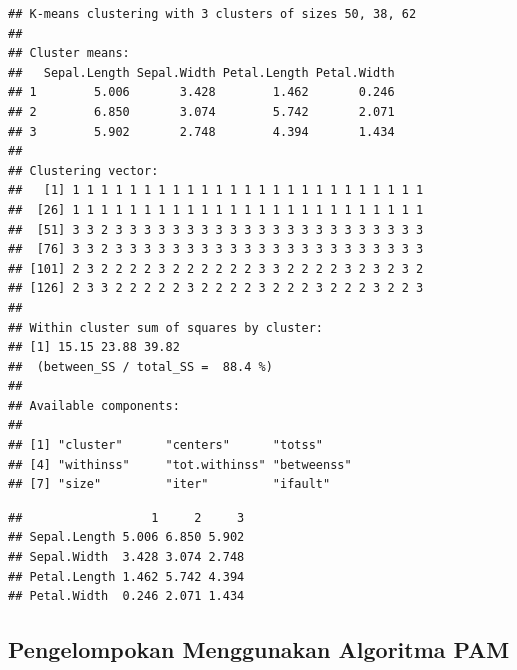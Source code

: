 \documentclass[
]{book}
\newenvironment{Shaded}{\begin{snugshade}}{\end{snugshade}}
\newcommand{\CommentTok}[1]{\textcolor[rgb]{0.56,0.35,0.01}{\textit{#1}}}
\newcommand{\ControlFlowTok}[1]{\textcolor[rgb]{0.13,0.29,0.53}{\textbf{#1}}}
\newcommand{\FunctionTok}[1]{\textcolor[rgb]{0.13,0.29,0.53}{\textbf{#1}}}
\newcommand{\NormalTok}[1]{#1}
\newcommand{\OtherTok}[1]{\textcolor[rgb]{0.56,0.35,0.01}{#1}}
\newcommand{\SpecialCharTok}[1]{\textcolor[rgb]{0.81,0.36,0.00}{\textbf{#1}}}
\theoremstyle{definition}
\theoremstyle{definition}
\theoremstyle{definition}
\theoremstyle{definition}
\theoremstyle{remark}
\begin{document}
\begin{verbatim}
## K-means clustering with 3 clusters of sizes 50, 38, 62
## 
## Cluster means:
##   Sepal.Length Sepal.Width Petal.Length Petal.Width
## 1        5.006       3.428        1.462       0.246
## 2        6.850       3.074        5.742       2.071
## 3        5.902       2.748        4.394       1.434
## 
## Clustering vector:
##   [1] 1 1 1 1 1 1 1 1 1 1 1 1 1 1 1 1 1 1 1 1 1 1 1 1 1
##  [26] 1 1 1 1 1 1 1 1 1 1 1 1 1 1 1 1 1 1 1 1 1 1 1 1 1
##  [51] 3 3 2 3 3 3 3 3 3 3 3 3 3 3 3 3 3 3 3 3 3 3 3 3 3
##  [76] 3 3 2 3 3 3 3 3 3 3 3 3 3 3 3 3 3 3 3 3 3 3 3 3 3
## [101] 2 3 2 2 2 2 3 2 2 2 2 2 2 3 3 2 2 2 2 3 2 3 2 3 2
## [126] 2 3 3 2 2 2 2 2 3 2 2 2 2 3 2 2 2 3 2 2 2 3 2 2 3
## 
## Within cluster sum of squares by cluster:
## [1] 15.15 23.88 39.82
##  (between_SS / total_SS =  88.4 %)
## 
## Available components:
## 
## [1] "cluster"      "centers"      "totss"       
## [4] "withinss"     "tot.withinss" "betweenss"   
## [7] "size"         "iter"         "ifault"
\end{verbatim}

\begin{Shaded}
\end{Shaded}

\begin{verbatim}
##                  1     2     3
## Sepal.Length 5.006 6.850 5.902
## Sepal.Width  3.428 3.074 2.748
## Petal.Length 1.462 5.742 4.394
## Petal.Width  0.246 2.071 1.434
\end{verbatim}

\hypertarget{pengelompokan-menggunakan-algoritma-pam}{%
\subsection{Pengelompokan Menggunakan Algoritma PAM}\label{pengelompokan-menggunakan-algoritma-pam}}
\end{document}
